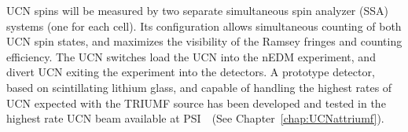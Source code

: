 UCN spins will be measured by two separate simultaneous spin analyzer
(SSA) systems (one for each cell). Its configuration allows
simultaneous counting of both UCN spin states, and maximizes the
visibility of the Ramsey fringes and counting efficiency.  The UCN
switches load the UCN into the nEDM experiment, and divert UCN exiting
the experiment into the detectors.  A prototype detector, based on
scintillating lithium glass, and capable of handling the highest rates
of UCN expected with the TRIUMF source has been developed and tested
in the highest rate UCN beam available at
PSI~\cite{jamieson2017characterization}~(See
Chapter~\ref{chap:UCNattriumf}).










